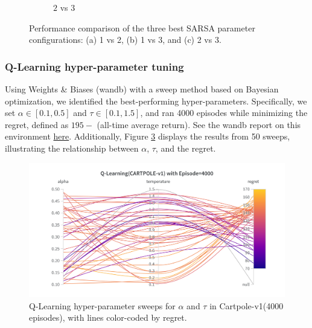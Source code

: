 \documentclass[11pt, a4]{article}
\begin{document}
\begin{figure}[H]
\begin{subfigure}[h]{0.7\textwidth}
						\caption{$2$ vs $3$}
						\label{fig:sarsacartpole2vs3}
					\end{subfigure}
					\caption{Performance comparison of the three best SARSA parameter configurations: (a) 1 vs 2, (b) 1 vs 3, and (c) 2 vs 3.}
					\label{fig:sarsacartpole}
				\end{figure}
			\subsubsection{Q-Learning hyper-parameter tuning}
				Using Weights \& Biases (wandb) with a sweep method based on Bayesian optimization, we identified the best-performing hyper-parameters. Specifically, we set $\alpha \in [0.1, 0.5]$ and $\tau \in [0.1, 1.5]$, and ran 4000 episodes while minimizing the regret, defined as \(195 -\) (all-time average return). See the wandb report on this environment \href{https://api.wandb.ai/links/ee24e009-iitm/il2a2cjz}{here}. Additionally, Figure \ref{fig:qlearningcartpole-regret} displays the results from 50 sweeps, illustrating the relationship between $\alpha$, $\tau$, and the regret.
				\begin{figure}[H]
					\centering
					\includegraphics[width=1\linewidth]{qlearning-hyp-tuning-cartpole.png}
					\caption{Q-Learning hyper-parameter sweeps for $\alpha$ and $\tau$ in Cartpole-v1(4000 episodes), with lines color-coded by regret.}
					\label{fig:qlearningcartpole-regret}
				\end{figure}
\end{document}
